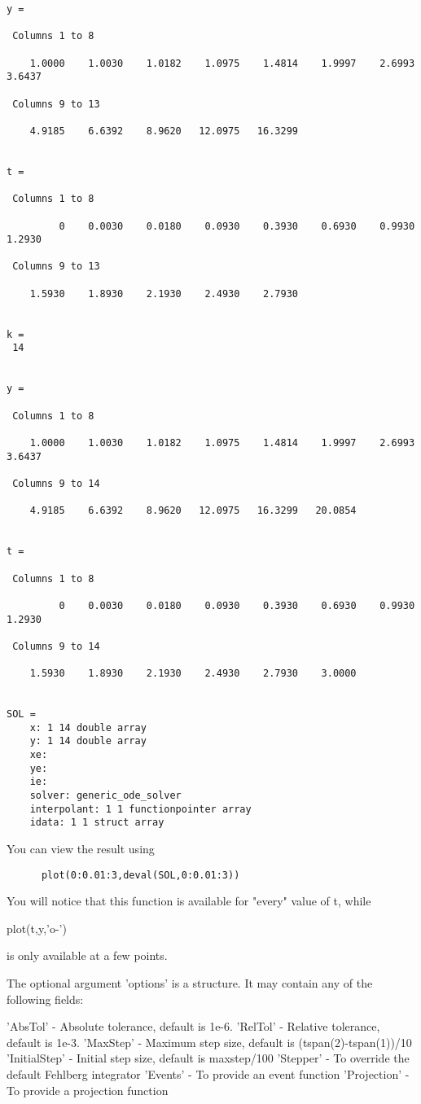 \begin{verbatim}
y = 

 Columns 1 to 8

    1.0000    1.0030    1.0182    1.0975    1.4814    1.9997    2.6993    3.6437 

 Columns 9 to 13

    4.9185    6.6392    8.9620   12.0975   16.3299 


t = 

 Columns 1 to 8

         0    0.0030    0.0180    0.0930    0.3930    0.6930    0.9930    1.2930 

 Columns 9 to 13

    1.5930    1.8930    2.1930    2.4930    2.7930 


k = 
 14 


y = 

 Columns 1 to 8

    1.0000    1.0030    1.0182    1.0975    1.4814    1.9997    2.6993    3.6437 

 Columns 9 to 14

    4.9185    6.6392    8.9620   12.0975   16.3299   20.0854 


t = 

 Columns 1 to 8

         0    0.0030    0.0180    0.0930    0.3930    0.6930    0.9930    1.2930 

 Columns 9 to 14

    1.5930    1.8930    2.1930    2.4930    2.7930    3.0000 


SOL = 
    x: 1 14 double array
    y: 1 14 double array
    xe: 
    ye: 
    ie: 
    solver: generic_ode_solver
    interpolant: 1 1 functionpointer array
    idata: 1 1 struct array
\end{verbatim}
 You can view the result using
\begin{verbatim}
      plot(0:0.01:3,deval(SOL,0:0.01:3))
\end{verbatim}
 You will notice that this function is available for "every" value of t, while

      plot(t,y,'o-')

 is only available at a few points.

 The optional argument 'options' is a structure. It may contain any of the
 following fields:

 'AbsTol'      - Absolute tolerance, default is 1e-6.
 'RelTol'      - Relative tolerance, default is 1e-3.
 'MaxStep'     - Maximum step size, default is (tspan(2)-tspan(1))/10
 'InitialStep' - Initial step size, default is maxstep/100
 'Stepper'     - To override the default Fehlberg integrator
 'Events'      - To provide an event function
 'Projection'  - To provide a projection function


